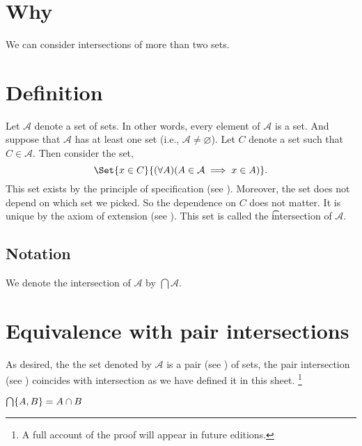 
\section*{Why}

We can consider intersections of more than two sets.

\section*{Definition}

Let $\mathcal{A} $ denote a set of sets.
In other words, every element of $\mathcal{A} $ is a set.
And suppose that $\mathcal{A} $ has at least one set (i.e., $\mathcal{A}  \neq \varnothing$).
Let $C$ denote a set such that $C \in \mathcal{A} $.
Then consider the set,
  \[
\Set{x \in C}{(\forall A)(A \in \mathcal{A}  \implies x \in A)}.
  \]
This set exists by the principle of specification (see ).
Moreover, the set does not depend on which set we picked.
So the dependence on $C$ does not matter.
It is unique by the axiom of extension (see ).
This set is called the \t{intersection} of $\mathcal{A} $.

\subsection*{Notation}

We denote the intersection of $\mathcal{A} $ by $\bigcap \mathcal{A} $.

\section*{Equivalence with pair intersections}

As desired, the the set denoted by $\mathcal{A} $ is a pair (see ) of sets, the pair intersection (see ) coincides with intersection as we have defined it in this sheet.
  \ifhmode\unskip\fi\footnote{
A full account of the proof will appear in future editions.
  }

\begin{proposition}$\bigcap \{A, B\} = A \cap  B$\end{proposition}
\blankpage
